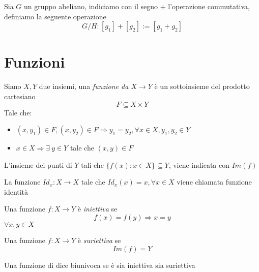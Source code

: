         \begin{definition}
            Sia $G$ un gruppo abeliano, indiciamo con il segno $+$ l'operazione commutativa, definiamo la seguente operazione $$G/H : [g_1] + [g_2] := [g_1 + g_2]$$

        \end{definition}
    
    \section{Funzioni}
        \begin{definition}[Funzione]
            Siano $X,Y$ due insiemi, una \emph{funzione da $X \rightarrow Y$} è un sottoinsieme del prodotto cartesiano $$F \subseteq X\times Y$$
            Tale che:
            \begin{itemize}
                \item $(x,y_1) \in F, (x,y_2) \in F \Rightarrow y_1 = y_2, \forall x \in X, y_1,y_2 \in Y$
                \item $x \in X \Rightarrow \exists \ y \in Y$ tale che $(x,y) \in F$ 
            \end{itemize}
        \end{definition}
        \begin{definition}
            L'insieme dei punti di $Y$ tali che $\{f(x):x \in X\} \subseteq Y$, viene indicata con $Im(f)$
        \end{definition}
        \begin{definition}
            La funzione $Id_x : X \rightarrow X$ tale che $Id_x(x) = x, \forall x \in X$ viene chiamata funzione identità
        \end{definition}
        \begin{definition}
            Una funzione $f : X \rightarrow Y$ è \emph{iniettiva} se $$f(x)=f(y) \Rightarrow x=y$$ $\forall x,y \in X$
        \end{definition}
        \begin{definition}
            Una funzione $f : X \rightarrow Y$ è \emph{suriettiva} se $$Im(f)=Y$$ 
        \end{definition}
        \begin{definition}
            Una funzione di dice biunivoca se è sia iniettiva sia suriettiva
        \end{definition}
